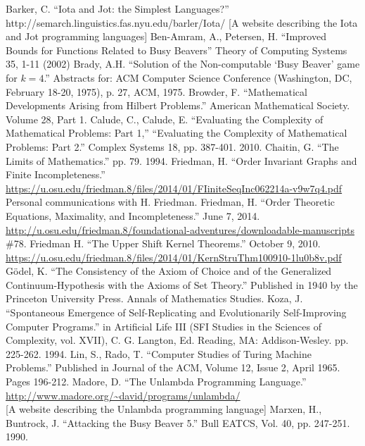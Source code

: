 \documentclass[11pt]{article}
\begin{document}
\begin{thebibliography}{100}
 Barker, C. ``Iota and Jot: the Simplest Languages?''
http://semarch.linguistics.fas.nyu.edu/barler/Iota/
[A website describing the Iota and Jot programming languages]
 Ben-Amram, A., Petersen, H. ``Improved Bounds for Functions Related to Busy Beavers'' Theory of Computing Systems 35, 1-11 (2002)
 Brady, A.H. ``Solution of the Non-computable `Busy Beaver' game for $k=4$.'' Abstracts for: ACM Computer Science Conference (Washington, DC, February 18-20, 1975), p. 27, ACM, 1975.
 Browder, F. ``Mathematical Developments Arising from Hilbert Problems.'' American Mathematical Society. Volume 28, Part 1.
 Calude, C., Calude, E. ``Evaluating the Complexity of Mathematical Problems: Part 1,'' ``Evaluating the Complexity of Mathematical Problems: Part 2.'' Complex Systems 18, pp. 387-401. 2010.
 Chaitin, G. ``The Limits of Mathematics.'' pp. 79. 1994.
 Friedman, H. ``Order Invariant Graphs and Finite Incompleteness.'' \url{https://u.osu.edu/friedman.8/files/2014/01/FIiniteSeqInc062214a-v9w7q4.pdf}
 Personal communications with H. Friedman.
 Friedman, H. ``Order Theoretic Equations, Maximality, and Incompleteness.'' June 7, 2014. \url{http://u.osu.edu/friedman.8/foundational-adventures/downloadable-manuscripts} \\
\#78.
 Friedman H. ``The Upper Shift Kernel Theorems.'' October 9, 2010. \url{https://u.osu.edu/friedman.8/files/2014/01/KernStruThm100910-1lu0b8v.pdf}
 G\"odel, K. ``The Consistency of the Axiom of Choice and of the Generalized Continuum-Hypothesis with the Axioms of Set Theory.'' Published in 1940 by the Princeton University Press. Annals of Mathematics Studies.
 Koza, J. ``Spontaneous Emergence of Self-Replicating and Evolutionarily Self-Improving Computer Programs.'' in Artificial Life III (SFI Studies in the Sciences of Complexity, vol. XVII), C. G. Langton, Ed. Reading, MA: Addison-Wesley. pp. 225-262. 1994.
 Lin, S., Rado, T. ``Computer Studies of Turing Machine Problems.'' Published in Journal of the ACM, Volume 12, Issue 2, April 1965. Pages 196-212.
 Madore, D. ``The Unlambda Programming Language.'' \url{http://www.madore.org/~david/programs/unlambda/} \\
{[A website describing the Unlambda programming language]}
 Marxen, H., Buntrock, J. ``Attacking the Busy Beaver 5.'' Bull EATCS, Vol. 40, pp. 247-251. 1990.

\end{thebibliography}
\end{document}
